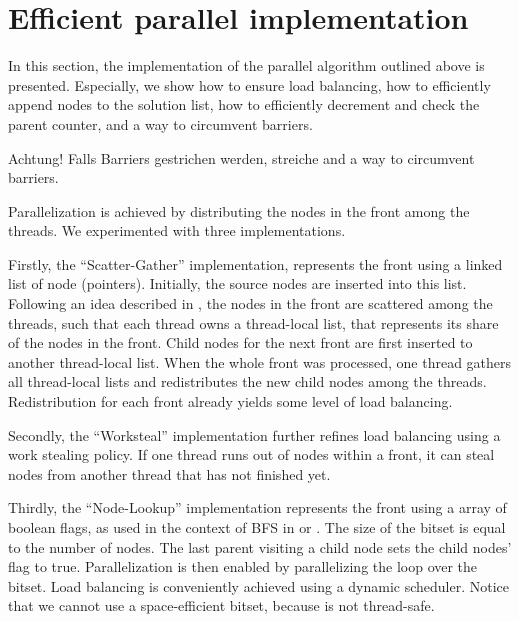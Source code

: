 \section{Efficient parallel implementation}\label{sec:yourmethod}
In this section, the implementation of the parallel algorithm outlined above is presented.
Especially, we show how to ensure load balancing, how to efficiently append nodes to the solution list, how to efficiently decrement and check the parent counter, and a way to circumvent barriers.
\begin{invisible}
 Achtung! Falls Barriers gestrichen werden, streiche and a way to circumvent barriers.
\end{invisible}

Parallelization is achieved by distributing the nodes in the front among the threads. We experimented with three implementations.

Firstly, the ``Scatter-Gather'' implementation, represents the front using a linked list of node (pointers). Initially, the source nodes are inserted into this list.
Following an idea described in \cite{bulucc2011parallel}, the nodes in the front are scattered among the threads, such that each thread owns a thread-local list,
that represents its share of the nodes in the front.
Child nodes for the next front are first inserted to another thread-local list.
When the whole front was processed, one thread gathers all thread-local lists and redistributes the new child nodes among the threads.
Redistribution for each front already yields some level of load balancing.

Secondly, the ``Worksteal'' implementation further refines load balancing using a work stealing policy.
If one thread runs out of nodes within a front, it can steal nodes from another thread that has not finished yet.

Thirdly, the ``Node-Lookup'' implementation represents the front using a array of boolean flags, as used in the context of BFS in \cite{agarwal2010scalable} or \cite{beamer2013direction}. The size of the bitset is equal to the number of nodes.
The last parent visiting a child node sets the child nodes' flag to true. Parallelization is then enabled by parallelizing the loop over the bitset.
Load balancing is conveniently achieved using a dynamic scheduler.
Notice that we cannot use a space-efficient bitset, because is not thread-safe.

